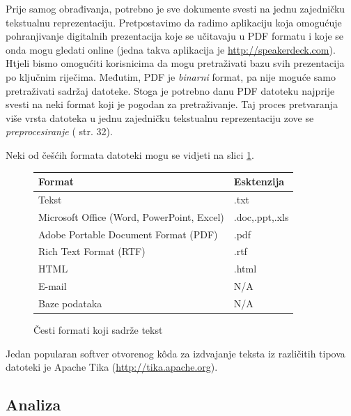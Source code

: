 \documentclass[a4paper,twoside,12pt]{scrreprt}
\begin{document}
Prije samog obrađivanja, potrebno je sve dokumente svesti na jednu zajedničku tekstualnu reprezentaciju. Pretpostavimo da radimo aplikaciju koja omogućuje pohranjivanje digitalnih prezentacija koje se učitavaju u PDF formatu i koje se onda mogu gledati online (jedna takva aplikacija je \url{http://speakerdeck.com}). Htjeli bismo omogućiti korisnicima da mogu pretraživati bazu svih prezentacija po ključnim riječima. Međutim, PDF je \textit{binarni} format, pa nije moguće samo pretraživati sadržaj datoteke. Stoga je potrebno danu PDF datoteku najprije svesti na neki format koji je pogodan za pretraživanje. Taj proces pretvaranja više vrsta datoteka u jednu zajedničku tekstualnu reprezentaciju zove se \textit{preprocesiranje} (\cite{taming} str. 32).

Neki od češćih formata datoteki mogu se vidjeti na slici \ref{formats}.

{\renewcommand{\arraystretch}{1.2}
\begin{figure}[H]
  \centering
  \begin{tabular}{|l|l|}
    \hline
    \textbf{Format}                            & \textbf{Esktenzija} \\
    \hline
    Tekst                                      & .txt                \\
    \hline
    Microsoft Office (Word, PowerPoint, Excel) & .doc,.ppt,.xls      \\
    \hline
    Adobe Portable Document Format (PDF)       & .pdf                \\
    \hline
    Rich Text Format (RTF)                     & .rtf                \\
    \hline
    HTML                                       & .html               \\
    \hline
    E-mail                                     & N/A                 \\
    \hline
    Baze podataka                              & N/A                 \\
    \hline
  \end{tabular}
  \caption{Česti formati koji sadrže tekst}
  \label{formats}
\end{figure}
}

Jedan popularan softver otvorenog kôda za izdvajanje teksta iz različitih tipova datoteki je Apache Tika (\url{http://tika.apache.org}).

\subsection{Analiza}
\end{document}
